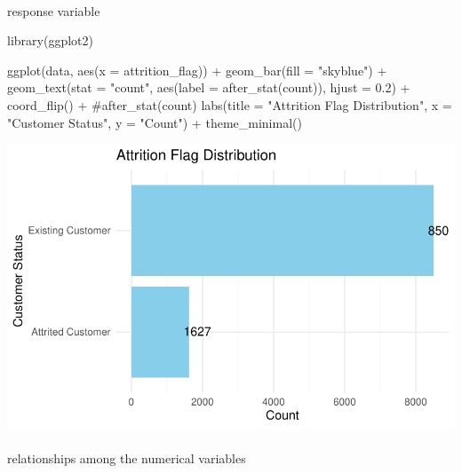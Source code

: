 \documentclass[
  letterpaper,
  DIV=11,
  numbers=noendperiod]{scrartcl}
\makeatletter
\let\oldparagraph\paragraph
\renewcommand{\paragraph}{
    \@ifstar
      \xxxParagraphStar
      \xxxParagraphNoStar
  }
\newcommand{\xxxParagraphStar}[1]{\oldparagraph*{#1}\mbox{}}
\newcommand{\xxxParagraphNoStar}[1]{\oldparagraph{#1}\mbox{}}
\newenvironment{Shaded}{\begin{snugshade}}{\end{snugshade}}
\newcommand{\AttributeTok}[1]{\textcolor[rgb]{0.40,0.45,0.13}{#1}}
\newcommand{\CommentTok}[1]{\textcolor[rgb]{0.37,0.37,0.37}{#1}}
\newcommand{\FloatTok}[1]{\textcolor[rgb]{0.68,0.00,0.00}{#1}}
\newcommand{\FunctionTok}[1]{\textcolor[rgb]{0.28,0.35,0.67}{#1}}
\newcommand{\NormalTok}[1]{\textcolor[rgb]{0.00,0.23,0.31}{#1}}
\newcommand{\SpecialCharTok}[1]{\textcolor[rgb]{0.37,0.37,0.37}{#1}}
\newcommand{\StringTok}[1]{\textcolor[rgb]{0.13,0.47,0.30}{#1}}
\makeatother
\begin{document}
\paragraph{response variable}\label{response-variable}

\begin{Shaded}
\begin{Highlighting}[]
\FunctionTok{library}\NormalTok{(ggplot2)}

\FunctionTok{ggplot}\NormalTok{(data, }\FunctionTok{aes}\NormalTok{(}\AttributeTok{x =}\NormalTok{ attrition\_flag)) }\SpecialCharTok{+}
  \FunctionTok{geom\_bar}\NormalTok{(}\AttributeTok{fill =} \StringTok{"skyblue"}\NormalTok{) }\SpecialCharTok{+}
  \FunctionTok{geom\_text}\NormalTok{(}\AttributeTok{stat =} \StringTok{"count"}\NormalTok{, }\FunctionTok{aes}\NormalTok{(}\AttributeTok{label =} \FunctionTok{after\_stat}\NormalTok{(count)), }\AttributeTok{hjust =} \FloatTok{0.2}\NormalTok{) }\SpecialCharTok{+} 
  \FunctionTok{coord\_flip}\NormalTok{() }\SpecialCharTok{+}  \CommentTok{\#after\_stat(count)}
  \FunctionTok{labs}\NormalTok{(}\AttributeTok{title =} \StringTok{"Attrition Flag Distribution"}\NormalTok{,}
       \AttributeTok{x =} \StringTok{"Customer Status"}\NormalTok{,}
       \AttributeTok{y =} \StringTok{"Count"}\NormalTok{) }\SpecialCharTok{+}
  \FunctionTok{theme\_minimal}\NormalTok{()}
\end{Highlighting}
\end{Shaded}

\includegraphics{Tackling-Attrition-at-Tifosi-Bank_files/figure-pdf/unnamed-chunk-9-1.pdf}

\paragraph{relationships among the numerical
variables}\label{relationships-among-the-numerical-variables}
\end{document}
